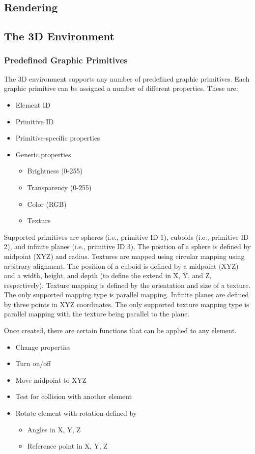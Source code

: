 \documentclass[letterpaper,oneside,12pt]{article}
\begin{document}
\subsection{Rendering}



\subsection{The 3D Environment}

\subsubsection{Predefined Graphic Primitives}
The 3D environment supports any number of predefined graphic primitives. 
Each graphic primitive can be assigned a number of different properties. 
These are:
\begin{itemize}
 \item Element ID
 \item Primitive ID
 \item Primitive-specific properties
 \item Generic properties
       \begin{itemize}
        \item Brightness (0-255)
        \item Transparency (0-255)
        \item Color (RGB)
        \item Texture
       \end{itemize}
\end{itemize}
Supported primitives are spheres (i.e., primitive ID 1), cuboids (i.e., primitive ID 2), 
and infinite planes (i.e., primitive ID 3). The position
of a sphere is defined by midpoint (XYZ) and radius. Textures are mapped using
circular mapping using arbitrary alignment. The position of a cuboid is defined
by a midpoint (XYZ) and a width, height, and depth (to define the extend in 
X, Y, and Z, respectively). Texture mapping is defined by the orientation and
size of a texture. The only supported mapping type is parallel mapping.
Infinite planes are defined by three points in XYZ coordinates. The only supported
texture mapping type is parallel mapping with the texture being parallel to the plane.

Once created, there are certain functions that can be applied to any element.
\begin{itemize}
 \item Change properties
 \item Turn on/off
 \item Move midpoint to XYZ
 \item Test for collision with another element
 \item Rotate element with rotation defined by
       \begin{itemize}
        \item Angles in X, Y, Z
        \item Reference point in X, Y, Z
       \end{itemize}
\end{itemize}
\end{document}
